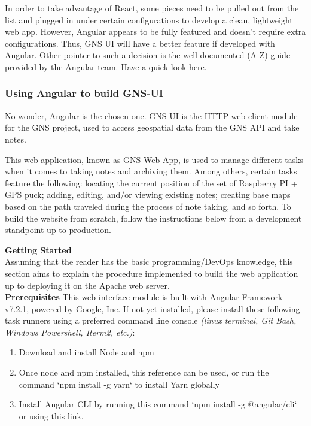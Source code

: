 In order to take advantage of React, some pieces need to be pulled out from the list and plugged in under certain configurations to develop a clean, lightweight web app. However, Angular appears to be fully featured and doesn’t require extra configurations. Thus, GNS UI will have a better feature if developed with Angular. Other pointer to such a decision is the well-documented (A-Z) guide provided by the Angular team. Have a quick look \href{https://angular.io/docs}{here}. 

\vspace{1.0cm}
\noindent
\subsubsection{Using Angular to build GNS-UI}
No wonder, Angular is the chosen one. GNS UI is the HTTP web client module for the GNS project, used to access geospatial data from the GNS API and take notes.

This web application, known as GNS Web App, is used to manage different tasks when it comes to taking notes and archiving them. Among others, certain tasks feature the following: locating the current position of the set of Raspberry PI + GPS puck; adding, editing, and/or viewing existing notes; creating base maps based on the path traveled during the process of note taking, and so forth. To build the website from scratch, follow the instructions below from a development standpoint up to production.

\vspace{1.0cm}
\noindent
\textbf{Getting Started}\\
Assuming that the reader has the basic programming/DevOps knowledge, this section aims to explain the procedure implemented to build the web application up to deploying it on the Apache web server.\\

\noindent
\textbf{Prerequisites}
This web interface module is built with \href{https://angular.io}{Angular Framework v7.2.1}, powered by Google, Inc. If not yet installed, please install these following task runners using a preferred command line console \textit{(linux terminal, Git Bash, Windows Powershell, Iterm2, etc.)}:

\begin{enumerate}
    \item Download and install Node and npm 
    \item Once node and npm installed, this reference can be used, or run the command `npm install -g yarn` to install Yarn globally 
    \item Install Angular CLI by running this command `npm install -g @angular/cli` or using this link.
\end{enumerate}

